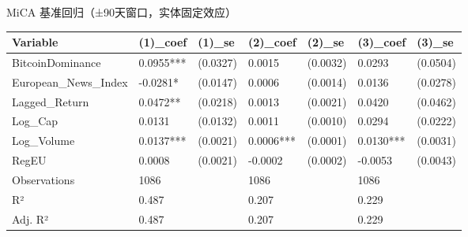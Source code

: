 \caption{MiCA 基准回归（±90天窗口，实体固定效应）}
\begin{tabular}{lllllll}
\toprule
Variable & (1)_coef & (1)_se & (2)_coef & (2)_se & (3)_coef & (3)_se \\
\midrule
BitcoinDominance & 0.0955*** & (0.0327) & 0.0015 & (0.0032) & 0.0293 & (0.0504) \\
European_News_Index & -0.0281* & (0.0147) & 0.0006 & (0.0014) & 0.0136 & (0.0278) \\
Lagged_Return & 0.0472** & (0.0218) & 0.0013 & (0.0021) & 0.0420 & (0.0462) \\
Log_Cap & 0.0131 & (0.0132) & 0.0011 & (0.0010) & 0.0294 & (0.0222) \\
Log_Volume & 0.0137*** & (0.0021) & 0.0006*** & (0.0001) & 0.0130*** & (0.0031) \\
RegEU & 0.0008 & (0.0021) & -0.0002 & (0.0002) & -0.0053 & (0.0043) \\
Observations & 1086 &  & 1086 &  & 1086 &  \\
R² & 0.487 &  & 0.207 &  & 0.229 &  \\
Adj. R² & 0.487 &  & 0.207 &  & 0.229 &  \\
\bottomrule
\end{tabular}
